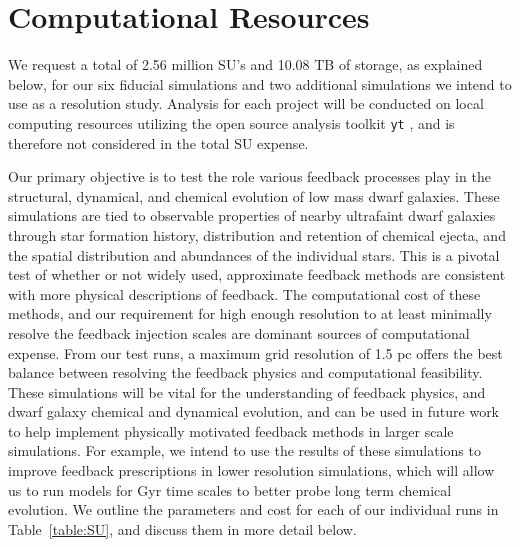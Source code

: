 \documentclass[11pt]{article}
\begin{document}
\section{Computational Resources}
We request a total of 2.56 million SU's and 10.08 TB of storage, as explained below, for our six fiducial simulations and two additional simulations we intend to use as a resolution study. Analysis for each project will be conducted on local computing resources utilizing the open source analysis toolkit \texttt{yt} \citep{yt}, and is therefore not considered in the total SU expense.

Our primary objective is to test the role various feedback processes play in the structural, dynamical, and chemical evolution of low mass dwarf galaxies. These simulations are tied to observable properties of nearby ultrafaint dwarf galaxies through star formation history, distribution and retention of chemical ejecta, and the spatial distribution and abundances of the individual stars. This is a pivotal test of whether or not widely used, approximate feedback methods are consistent with more physical descriptions of feedback. The computational cost of these methods, and our requirement for high enough resolution to at least minimally resolve the feedback injection scales are dominant sources of computational expense. From our test runs, a maximum grid resolution of 1.5 pc offers the best balance between resolving the feedback physics and computational feasibility. These simulations will be vital for the understanding of feedback physics, and dwarf galaxy chemical and dynamical evolution, and can be used in future work to help implement physically motivated feedback methods in larger scale simulations. For example, we intend to use the results of these simulations to improve feedback prescriptions in lower resolution simulations, which will allow us to run models for Gyr time scales to better probe long term chemical evolution. We outline the parameters and cost for each of our individual runs in Table~\ref{table:SU}, and discuss them in more detail below.
\end{document}
